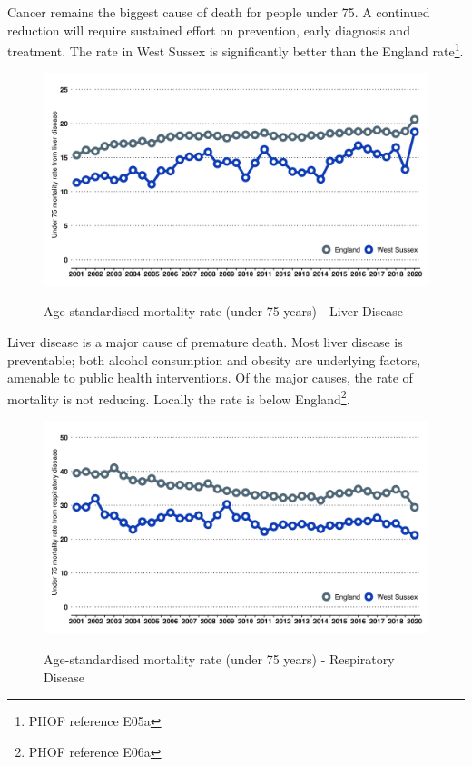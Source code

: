 Cancer remains the biggest cause of death for people under 75. A continued reduction will require sustained effort on prevention, early diagnosis and treatment. The rate in West Sussex is significantly better than the England rate\footnote{PHOF reference E05a}.

\begin{figure}[htp]
    \caption[Age-standardised mortality rate (under 75 years) - Liver Disease]{Age-standardised mortality rate (under 75 years) - Liver Disease}
    \centering
    \includegraphics[width=.95\linewidth]{images/u75_liver_line.png}
    \label{fig:u75_liver_b}
\end{figure}

Liver disease is a major cause of premature death. Most liver disease is preventable; both alcohol consumption and obesity are underlying factors, amenable to public health interventions. Of the major causes, the rate of mortality is not reducing. Locally the rate is below England\footnote{PHOF reference E06a}. 

\begin{figure}[htp]
    \caption[Age-standardised mortality rate (under 75 years) - Respiratory Disease]{Age-standardised mortality rate (under 75 years) - Respiratory Disease}
    \centering
    \includegraphics[width=.95\linewidth]{images/u75_respiratory_line.png}
    \label{fig:u75_resp}
\end{figure}

